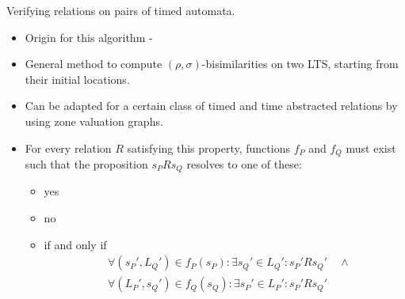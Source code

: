 \documentclass{beamer}
\begin{document}
\begin{frame}{Verifying relations on pairs of timed automata.}
  \begin{itemize}
  \item Origin for this algorithm - \cite{arun2006bisimilarities} 
  \item General method to compute $(\rho, \sigma)$-bisimilarities on
    two LTS, starting from their initial locations.
  \item Can be adapted for a certain class of timed and time
    abstracted relations by using zone valuation graphs.
  \item For every relation $R$ satisfying this property, functions
    $f_P$ and $f_Q$ must exist such that the proposition $s_P R s_Q$
    resolves to one of these:
    \begin{itemize}
    \item yes
    \item no
    \item if and only if 
      \begin{align*} 
        &\forall (s_P', L_Q') \in f_P(s_P): \exists s_Q' \in
        L_Q': s_P' R s_Q' \quad \wedge \\
        &\forall (L_P', s_Q') \in f_Q(s_Q): \exists s_P' \in
        L_P': s_P' R s_Q'
      \end{align*} 
    \end{itemize}
  \end{itemize}
\end{frame}
\end{document}
